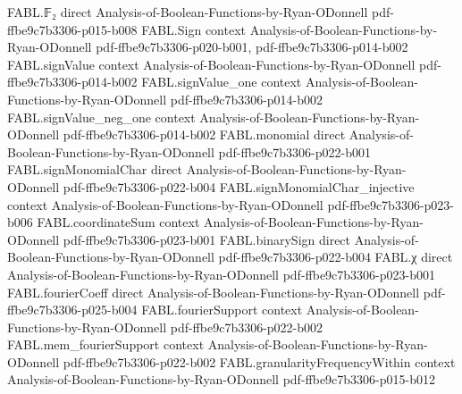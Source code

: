 \begin{theorem}
\label{FABL.sum_abs_vectorFourierCoeff_setIndicator_binaryAffineSubspace}
\leanok
{}
\proofstep
  {FABL.𝔽₂}
  {direct}
  {Analysis-of-Boolean-Functions-by-Ryan-ODonnell}
  {pdf-ffbe9c7b3306-p015-b008}
\proofstep
  {FABL.Sign}
  {context}
  {Analysis-of-Boolean-Functions-by-Ryan-ODonnell}
  {pdf-ffbe9c7b3306-p020-b001,
    pdf-ffbe9c7b3306-p014-b002}
\proofstep
  {FABL.signValue}
  {context}
  {Analysis-of-Boolean-Functions-by-Ryan-ODonnell}
  {pdf-ffbe9c7b3306-p014-b002}
\proofstep
  {FABL.signValue_one}
  {context}
  {Analysis-of-Boolean-Functions-by-Ryan-ODonnell}
  {pdf-ffbe9c7b3306-p014-b002}
\proofstep
  {FABL.signValue_neg_one}
  {context}
  {Analysis-of-Boolean-Functions-by-Ryan-ODonnell}
  {pdf-ffbe9c7b3306-p014-b002}
\proofstep
  {FABL.monomial}
  {direct}
  {Analysis-of-Boolean-Functions-by-Ryan-ODonnell}
  {pdf-ffbe9c7b3306-p022-b001}
\proofstep
  {FABL.signMonomialChar}
  {direct}
  {Analysis-of-Boolean-Functions-by-Ryan-ODonnell}
  {pdf-ffbe9c7b3306-p022-b004}
\proofstep
  {FABL.signMonomialChar_injective}
  {context}
  {Analysis-of-Boolean-Functions-by-Ryan-ODonnell}
  {pdf-ffbe9c7b3306-p023-b006}
\proofstep
  {FABL.coordinateSum}
  {context}
  {Analysis-of-Boolean-Functions-by-Ryan-ODonnell}
  {pdf-ffbe9c7b3306-p023-b001}
\proofstep
  {FABL.binarySign}
  {direct}
  {Analysis-of-Boolean-Functions-by-Ryan-ODonnell}
  {pdf-ffbe9c7b3306-p022-b004}
\proofstep
  {FABL.χ}
  {direct}
  {Analysis-of-Boolean-Functions-by-Ryan-ODonnell}
  {pdf-ffbe9c7b3306-p023-b001}
\proofstep
  {FABL.fourierCoeff}
  {direct}
  {Analysis-of-Boolean-Functions-by-Ryan-ODonnell}
  {pdf-ffbe9c7b3306-p025-b004}
\proofstep
  {FABL.fourierSupport}
  {context}
  {Analysis-of-Boolean-Functions-by-Ryan-ODonnell}
  {pdf-ffbe9c7b3306-p022-b002}
\proofstep
  {FABL.mem_fourierSupport}
  {context}
  {Analysis-of-Boolean-Functions-by-Ryan-ODonnell}
  {pdf-ffbe9c7b3306-p022-b002}
\proofstep
  {FABL.granularityFrequencyWithin}
  {context}
  {Analysis-of-Boolean-Functions-by-Ryan-ODonnell}
  {pdf-ffbe9c7b3306-p015-b012}

\end{theorem}
